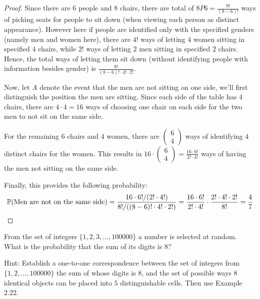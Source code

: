 \documentclass{article}
\begin{document}
\begin{proof}
    Since there are $6$ people and $8$ chairs, there are total of $8P6 = \frac{8!}{(8-6)!}$ ways of picking seats for people to sit down (when viewing each person as distinct appearance). However here if people are identified only with the specified genders (namely men and women here), there are $4!$ ways of letting $4$ women sitting in specified $4$ chairs, while $2!$ ways of letting $2$ men sitting in specified $2$ chairs. Hence, the total ways of letting them sit down (without identifying people with information besides gender) is $\frac{8!}{(8-6)!\cdot 4!\cdot 2!}$.

    \hfil

    Now, let $A$ denote the event that the men are not sitting on one side, we'll first distinguish the position the men are sitting. Since each side of the table has $4$ chairs, there are $4 \cdot 4=16$ ways of choosing one chair on each side for the two men to not sit on the same side.

    For the remaining $6$ chairs and $4$ women, there are $\begin{pmatrix}6\\4\end{pmatrix}$ ways of identifying $4$ distinct chairs for the women. This results in $16\cdot \begin{pmatrix}6\\4\end{pmatrix} = \frac{16\cdot 6!}{2!\cdot 4!}$ ways of having the men not sitting on the same side.

    \hfil

    Finally, this provides the following probability:
    \begin{align}
        \mathbb{P}(\textmd{Men are not on the same side}) = \frac{16\cdot 6!/(2!\cdot 4!)}{8!/((8-6)!\cdot 4!\cdot 2!)} = \frac{16\cdot 6!}{2!\cdot 4!}\cdot \frac{2!\cdot 4!\cdot 2!}{8!} = \frac{4}{7}
    \end{align}
\end{proof}

\hfil

\begin{ques}\label{q10}
    From the set of integers $\{1,2,3,...,100000\}$ a number is selected at random. What is the probability that the sum of its digits is $8$?
    
    Hint: Establish a one-to-one correspondence between the set of integers from $\{1,2,...,100000\}$ the sum of whose digits is $8$, and the set of possible ways $8$ identical objects can be placed into $5$ distinguishable cells. Then use Example 2.22.  
\end{ques}
\end{document}
